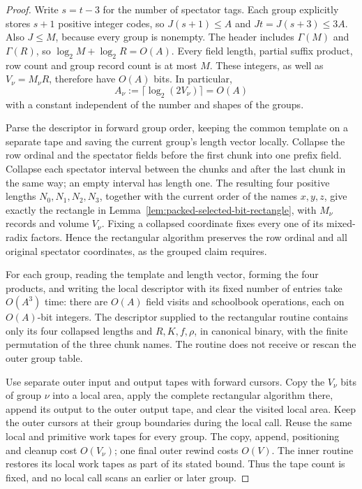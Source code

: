 \begin{proof}
Write $s=t-3$ for the number of spectator tags. Each group explicitly
stores $s+1$ positive integer codes, so $J(s+1)\le A$ and
$Jt=J(s+3)\le3A$. Also $J\le M$, because every group is nonempty.
The header includes $\Gamma(M)$ and $\Gamma(R)$, so
$\log_2 M+\log_2 R=O(A)$. Every field length, partial suffix product,
row count and group record count is at most $M$. These integers, as well
as $V_\nu=M_\nu R$, therefore have $O(A)$ bits. In particular,
\[
 A_\nu:=\lceil\log_2(2V_\nu)\rceil=O(A)
\]
with a constant independent of the number and shapes of the groups.

Parse the descriptor in forward group order, keeping the common template
on a separate tape and saving the current group's length vector locally.
Collapse the row ordinal and the spectator fields before the first chunk
into one prefix field. Collapse each spectator interval between the chunks
and after the last chunk in the same way; an empty interval has length
one. The resulting four positive lengths $N_0,N_1,N_2,N_3$, together
with the current order of the names $x,y,z$, give exactly the rectangle
in Lemma~\ref{lem:packed-selected-bit-rectangle}, with $M_\nu$ records
and volume $V_\nu$. Fixing a collapsed coordinate fixes every one of its
mixed-radix factors. Hence the rectangular algorithm preserves the row
ordinal and all original spectator coordinates, as the grouped claim
requires.

For each group, reading the template and length vector, forming the four
products, and writing the local descriptor with its fixed number of
entries take $O(A^3)$ time:
there are $O(A)$ field visits and schoolbook operations, each on
$O(A)$-bit integers. The descriptor supplied to the rectangular routine
contains only its four collapsed lengths and $R,K,f,\rho$, in canonical
binary, with the finite permutation of the three chunk names. The
routine does not receive or rescan the outer group table.

Use separate outer input and output tapes with forward cursors. Copy the
$V_\nu$ bits of group $\nu$ into a local area, apply the complete
rectangular algorithm there, append its output to the outer output tape,
and clear the visited local area. Keep the outer cursors at their group
boundaries during the local call. Reuse the same local and primitive work
tapes for every group. The copy, append, positioning and cleanup cost
$O(V_\nu)$; one final outer rewind costs $O(V)$. The inner routine
restores its local work tapes as part of its stated bound. Thus the tape
count is fixed, and no local call scans an earlier or later group.


\end{proof}
